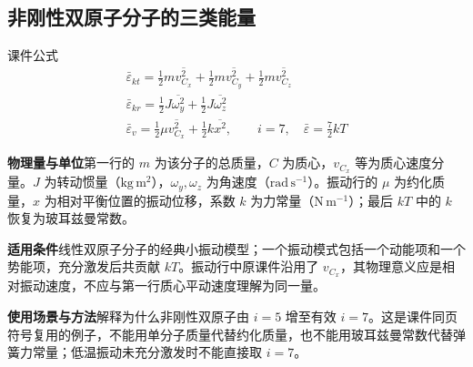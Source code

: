 \documentclass[UTF8,fontset=none,zihao=-4,a4paper]{ctexart}
\newcommand{\explain}[3]{\par\noindent\textbf{物理量与单位}\quad #1\par
\noindent\textbf{适用条件}\quad #2\par
\noindent\textbf{使用场景与方法}\quad #3\par}
\begin{document}
\par\noindent\begin{minipage}{\linewidth}
\subsection{非刚性双原子分子的三类能量}
\begin{infobox}[breakable=false]{课件公式}
\begin{gather*}\bar\varepsilon_{kt}=\frac12m\overline{v_{C_x}^2}+\frac12m\overline{v_{C_y}^2}+\frac12m\overline{v_{C_z}^2}\\\bar\varepsilon_{kr}=\frac12J\overline{\omega_y^2}+\frac12J\overline{\omega_z^2}\\\bar\varepsilon_v=\frac12\mu\overline{v_{C_x}^2}+\frac12k\overline{x^2},\qquad i=7,\quad\bar\varepsilon=\frac72kT\end{gather*}
\end{infobox}
\end{minipage}\par
\explain{第一行的 $m$ 为该分子的总质量，$C$ 为质心，$v_{C_x}$ 等为质心速度分量。$J$ 为转动惯量（$\mathrm{kg\,m^2}$），$\omega_y,\omega_z$ 为角速度（$\mathrm{rad\,s^{-1}}$）。振动行的 $\mu$ 为约化质量，$x$ 为相对平衡位置的振动位移，系数 $k$ 为力常量（$\mathrm{N\,m^{-1}}$）；最后 $kT$ 中的 $k$ 恢复为玻耳兹曼常数。}{线性双原子分子的经典小振动模型；一个振动模式包括一个动能项和一个势能项，充分激发后共贡献 $kT$。振动行中原课件沿用了 $v_{C_x}$，其物理意义应是相对振动速度，不应与第一行质心平动速度理解为同一量。}{解释为什么非刚性双原子由 $i=5$ 增至有效 $i=7$。这是课件同页符号复用的例子，不能用单分子质量代替约化质量，也不能用玻耳兹曼常数代替弹簧力常量；低温振动未充分激发时不能直接取 $i=7$。}
\end{document}
